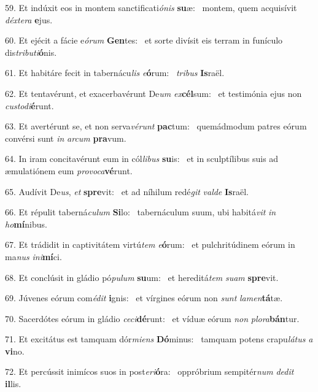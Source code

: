59. Et indúxit eos in montem sanctificati\textit{ó}\textit{nis} \textbf{su}æ: \ast\  montem, quem acquisívit \textit{déx}\textit{te}\textit{ra} \textbf{e}jus.\

60. Et ejécit a fácie e\textit{ó}\textit{rum} \textbf{Gen}tes: \ast\  et sorte divísit eis terram in funículo dis\textit{tri}\textit{bu}\textit{ti}\textbf{ó}nis.\

61. Et habitáre fecit in tabernácu\textit{lis} \textit{e}\textbf{ó}rum: \ast\  \textit{tri}\textit{bus} \textbf{Is}raël.\

62. Et tentavérunt, et exacerbavérunt De\textit{um} \textit{ex}\textbf{cél}sum: \ast\  et testimónia ejus non \textit{cus}\textit{to}\textit{di}\textbf{é}runt.\

63. Et avertérunt se, et non serva\textit{vé}\textit{runt} \textbf{pac}tum: \ast\  quemádmodum patres eórum convérsi sunt \textit{in} \textit{ar}\textit{cum} \textbf{pra}vum.\

64. In iram concitavérunt eum in cól\textit{li}\textit{bus} \textbf{su}is: \ast\  et in sculptílibus suis ad æmulatiónem eum \textit{pro}\textit{vo}\textit{ca}\textbf{vé}runt.\

65. Audívit De\textit{us}, \textit{et} \textbf{spre}vit: \ast\  et ad níhilum redé\textit{git} \textit{val}\textit{de} \textbf{Is}raël.\

66. Et répulit taberná\textit{cu}\textit{lum} \textbf{Si}lo: \ast\  tabernáculum suum, ubi habitá\textit{vit} \textit{in} \textit{ho}\textbf{mí}nibus.\

67. Et trádidit in captivitátem virtú\textit{tem} \textit{e}\textbf{ó}rum: \ast\  et pulchritúdinem eórum in ma\textit{nus} \textit{in}\textit{i}\textbf{mí}ci.\

68. Et conclúsit in gládio pó\textit{pu}\textit{lum} \textbf{su}um: \ast\  et hereditá\textit{tem} \textit{su}\textit{am} \textbf{spre}vit.\

69. Júvenes eórum com\textit{é}\textit{dit} \textbf{i}gnis: \ast\  et vírgines eórum non \textit{sunt} \textit{la}\textit{men}\textbf{tá}tæ.\

70. Sacerdótes eórum in gládio \textit{ce}\textit{ci}\textbf{dé}runt: \ast\  et víduæ eórum \textit{non} \textit{plo}\textit{ra}\textbf{bán}tur.\

71. Et excitátus est tamquam dór\textit{mi}\textit{ens} \textbf{Dó}minus: \ast\  tamquam potens crapu\textit{lá}\textit{tus} \textit{a} \textbf{vi}no.\

72. Et percússit inimícos suos in post\textit{e}\textit{ri}\textbf{ó}ra: \ast\  oppróbrium sempitér\textit{num} \textit{de}\textit{dit} \textbf{il}lis.\


